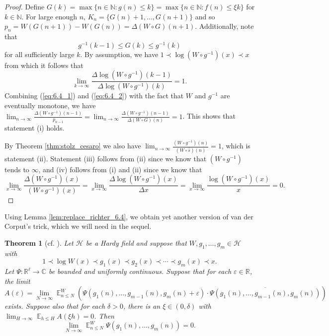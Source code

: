 \documentclass[12pt]{article}
\theoremstyle{plain} %
\newtheorem{theorem}{Theorem}[section]
\theoremstyle{definition} %
\theoremstyle{plain}
\theoremstyle{plain}
\numberwithin{equation}{section}
\newcommand{\N}{\mathbb{N}}
\newcommand{\R}{\mathbb{R}}
\newcommand{\C}{\mathbb{C}}
\renewcommand{\epsilon}{\varepsilon}
\renewcommand{\leq}{\leqslant}
\newcommand{\1}{\mathbbm{1}}
\newcommand{\E}{\operatorname{\mathbb{E}}}
\newcommand{\oo}{\infty}
\begin{document}
 \begin{proof}

Define $G(k) = \max\{n\in \N: {g(n)}\leq k\}
= \max\{n\in \N: f(n)\leq \xi k\}$ for $k\in \N$. For large enough $n$, $K_n = \{G(n)+1,\dots, G(n+1)\}$ and so $p_n = W(G(n+1))-W(G(n)) = \Delta (W\circ G)(n+1)$. Additionally, note that 
\begin{equation}\label{eq:6.4_1}
    g^{-1}(k-1)\leq G(k) \leq g^{-1}(k)
\end{equation} 
for all sufficiently large $k$. By assumption, we have $1\prec \log(W\circ g^{-1})(x)\prec x$ from which it follows that 
\begin{equation}\label{eq:6.4_2}
    \lim_{k\to\oo}\frac{\Delta \log(W\circ g^{-1})(k-1)}{\Delta \log(W\circ g^{-1})(k)}=1.
\end{equation}
Combining (\ref{eq:6.4_1}) and (\ref{eq:6.4_2}) with the fact that $W$ and $g^{-1}$ are eventually monotone, we have $\lim_{n\to\oo}\frac{\Delta (W\circ g^{-1})(n-1)}{p_{n-1}}=\lim_{n\to\oo}\frac{\Delta (W\circ g^{-1})(n-1)}{\Delta (W\circ G)(n)}=1$. This shows that statement (i) holds.

By Theorem \ref{thm:stolz_cesaro} we also have $\lim_{n\to\oo}\frac{ (W\circ g^{-1})(n)}{ (W\circ \hat{s})(n)}=1$, which is statement (ii). Statement (iii) follows from (ii) since we know that $(W\circ g^{-1})$ tends to $\oo$, and (iv) follows from (i) and (ii) since we know that 
\begin{equation}
    \lim_{x\to\oo}\frac{\Delta (W\circ g^{-1})(x)}{(W\circ g^{-1})(x)} =  \lim_{x\to\oo}\frac{\Delta \log (W\circ g^{-1})(x)}{\Delta x}
 = \lim_{x\to\oo}\frac{ \log (W\circ g^{-1})(x)}{ x} = 0.
 \end{equation}





 \end{proof}
 Using Lemma \ref{lem:replace_richter_6.4}, we obtain yet another version of van der Corput's trick, which we will need in the sequel.
\begin{theorem}[cf. {\cite[Proposition 6.1]{Richter23}}]\label{thm:funny_vdc}
Let $\mathcal{H}$ be a Hardy field and suppose that $W,g_1,\dots, g_{m}\in \mathcal{H}$ with 
\begin{equation}
    1\prec \log W(x)\prec g_1(x)\prec g_2(x)\prec\cdots \prec g_{m}(x)\prec x.
\end{equation}
Let $\Psi:\R^{\ell}\rightarrow \C$ be bounded and uniformly continuous. Suppose that for each $\epsilon\in \R$, the limit 
\begin{equation*}
    A({\epsilon}) = \lim_{N\to\infty}\E_{n\leq N}^W\left(\Psi(g_1(n),\dots, g_{m-1}(n),g_{m}(n)+\epsilon)\cdot \overline{\Psi(g_1(n),\dots, g_{m-1}(n),g_{m}(n))}\right)
\end{equation*}
exists. Suppose also that for each $\delta>0$, there is an $\xi\in (0,\delta)$ with $\lim_{H\to\infty}\E_{h\leq H}A(\xi h) = 0$. Then 
\begin{equation}
    \lim_{N\to\infty}\E_{n\leq N}^W\Psi(g_1(n),\dots, g_{m}(n))=0.
\end{equation}
\end{theorem}
\end{document}
